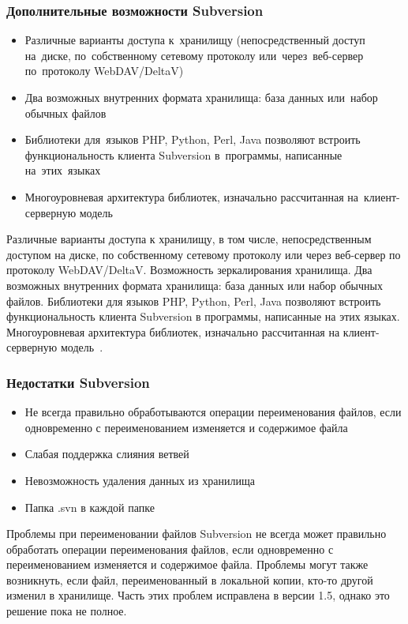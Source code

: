 \documentclass{../industrial-development}
\begin{document}
\begin{frame} \frametitle{Дополнительные возможности Subversion}
  
  \begin{itemize}
  \item Различные варианты доступа к~хранилищу (непосредственный доступ на~диске, по~собственному сетевому протоколу или~через~веб-сервер по~протоколу WebDAV/DeltaV)
  \item Два возможных внутренних формата хранилища: база данных или~набор обычных файлов
  \item Библиотеки для~языков PHP, Python, Perl, Java позволяют встроить функциональность клиента Subversion в~программы, написанные на~этих~языках
  \item Многоуровневая архитектура библиотек, изначально рассчитанная на~клиент-серверную модель
  \end{itemize}
\end{frame}

\lecturenotes

Различные варианты доступа к хранилищу, в том числе, непосредственным доступом на диске, по собственному сетевому протоколу или через веб-сервер по протоколу WebDAV/DeltaV.
Возможность зеркалирования хранилища.
Два возможных внутренних формата хранилища: база данных или набор обычных файлов.
Библиотеки для языков PHP, Python, Perl, Java позволяют встроить функциональность клиента Subversion в программы, написанные на этих языках.
Многоуровневая архитектура библиотек, изначально рассчитанная на клиент-серверную модель~\cite{SVNMotu}.

\begin{frame} \frametitle{Недостатки Subversion}
  \begin{itemize}
  \item Не всегда правильно обработываются операции переименования файлов, если одновременно с переименованием изменяется и содержимое файла
  \item Слабая поддержка слияния ветвей
  \item Невозможность удаления данных из хранилища
  \item Папка .svn в каждой папке
  \end{itemize}
\end{frame}

\lecturenotes

Проблемы при переименовании файлов
Subversion не всегда может правильно обработать операции переименования файлов, если одновременно с переименованием изменяется и содержимое файла. Проблемы могут также возникнуть, если файл, переименованный в локальной копии, кто-то другой изменил в хранилище. Часть этих проблем исправлена в версии 1.5, однако это решение пока не полное.
\end{document}
